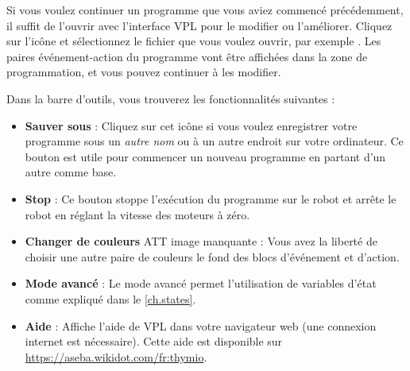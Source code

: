 Si vous voulez continuer un programme que vous aviez commencé précédemment, il suffit de l'ouvrir avec l'interface VPL pour le modifier ou l'améliorer.
Cliquez sur l'icône  et sélectionnez le fichier que vous voulez ouvrir, par exemple .
Les paires événement-action du programme vont être affichées dans la zone de programmation, et vous pouvez continuer à les modifier.


Dans la barre d'outils, vous trouverez les fonctionnalités suivantes :

\begin{itemize}

\item \textbf{Sauver sous}  :
Cliquez sur cet icône si vous voulez enregistrer votre programme sous un \emph{autre nom} ou à un autre endroit sur votre ordinateur.
Ce bouton est utile pour commencer un nouveau programme en partant d'un autre comme base.

\item \textbf{Stop}  : Ce bouton stoppe l'exécution du programme sur le robot et arrête le robot en réglant la vitesse des moteurs à zéro.

\item \textbf{Changer de couleurs}  ATT image manquante : Vous avez la liberté de choisir une autre paire de couleurs le fond des blocs d'événement et d'action.

\item \textbf{Mode avancé}  : Le mode avancé permet l'utilisation de variables d'état comme expliqué dans le \cref{ch.states}.

\item \textbf{Aide}  : Affiche l'aide de VPL dans votre navigateur web (une connexion internet est nécessaire).
Cette aide est disponible sur \url{https://aseba.wikidot.com/fr:thymio}.

\end{itemize}

